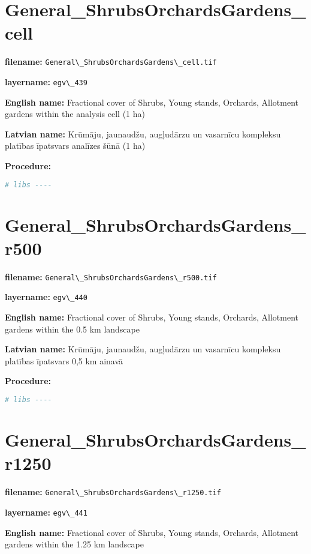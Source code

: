 \documentclass[
]{book}
\newcommand{\passthrough}[1]{#1}
\begin{document}
\section{General\_ShrubsOrchardsGardens\_cell}\label{ch06.439}

\textbf{filename:} \passthrough{\lstinline!General\_ShrubsOrchardsGardens\_cell.tif!}

\textbf{layername:} \passthrough{\lstinline!egv\_439!}

\textbf{English name:} Fractional cover of Shrubs, Young stands, Orchards, Allotment gardens within the analysis cell (1 ha)

\textbf{Latvian name:} Krūmāju, jaunaudžu, augļudārzu un vasarnīcu kompleksu platības īpatsvars analīzes šūnā (1 ha)

\textbf{Procedure:}

\begin{lstlisting}[language=R]
# libs ----
\end{lstlisting}

\section{General\_ShrubsOrchardsGardens\_r500}\label{ch06.440}

\textbf{filename:} \passthrough{\lstinline!General\_ShrubsOrchardsGardens\_r500.tif!}

\textbf{layername:} \passthrough{\lstinline!egv\_440!}

\textbf{English name:} Fractional cover of Shrubs, Young stands, Orchards, Allotment gardens within the 0.5 km landscape

\textbf{Latvian name:} Krūmāju, jaunaudžu, augļudārzu un vasarnīcu kompleksu platības īpatsvars 0,5 km ainavā

\textbf{Procedure:}

\begin{lstlisting}[language=R]
# libs ----
\end{lstlisting}

\section{General\_ShrubsOrchardsGardens\_r1250}\label{ch06.441}

\textbf{filename:} \passthrough{\lstinline!General\_ShrubsOrchardsGardens\_r1250.tif!}

\textbf{layername:} \passthrough{\lstinline!egv\_441!}

\textbf{English name:} Fractional cover of Shrubs, Young stands, Orchards, Allotment gardens within the 1.25 km landscape
\end{document}
